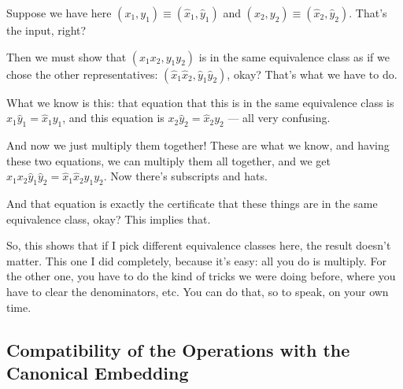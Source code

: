 \begin{speech}[01:03:19 - 01:05:38]
Suppose we have here $(x_1, y_1) \equiv (\hat{x}_1, \hat{y}_1)$  and $(x_2, y_2) \equiv (\hat{x}_2, \hat{y}_2)$.  That's the input, right?

Then we must show  that $(x_1 x_2, y_1 y_2)$ is in the same equivalence class as if we chose the other representatives: $(\hat{x}_1 \hat{x}_2, \hat{y}_1 \hat{y}_2)$,  okay? That's what we have to do.

What we know is this: that equation that this is in the same equivalence class is $x_1 \hat{y}_1 = \hat{x}_1 y_1$,  and this equation is $x_2 \hat{y}_2 = \hat{x}_2 y_2$  --- all very confusing.

And now we just multiply them together! These are what we know, and having these two equations, we can multiply them all together, and we get $x_1 x_2 \hat{y}_1 \hat{y}_2 = \hat{x}_1 \hat{x}_2 y_1 y_2$.  Now there's subscripts and hats.

And that equation is exactly the certificate that these things are in the same equivalence class, okay?  This implies that.

So, this shows that if I pick different equivalence classes here, the result doesn't matter. This one I did completely, because it's easy: all you do is multiply. For the other one, you have to do the kind of tricks we were doing before, where you have to clear the denominators, etc. You can do that, so to speak, on your own time.
\end{speech}

\subsection{Compatibility of the Operations with the Canonical Embedding}

